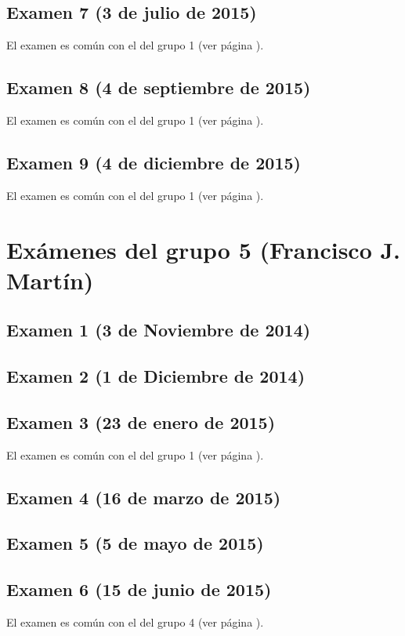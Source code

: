 \documentclass[a4paper,12pt,twoside]{book}
\begin{document}
\subsection{Examen 7 (3 de julio de 2015)}
El examen es común con el del grupo 1 (ver página \pageref{examen_14_15_5_7}).
\subsection{Examen 8 (4 de septiembre de 2015)}
El examen es común con el del grupo 1 (ver página \pageref{examen_14_15_5_7}).
\subsection{Examen 9 (4 de diciembre de 2015)}
El examen es común con el del grupo 1 (ver página \pageref{examen_14_15_5_9}).

\section{Exámenes del grupo 5 (Francisco J. Martín)}
\subsection{Examen 1 (3 de Noviembre de 2014)}
\subsection{Examen 2 (1 de Diciembre de 2014)}
\subsection{Examen 3 (23 de enero de 2015)}
El examen es común con el del grupo 1 (ver página \pageref{examen_14_15_5_3}).
\subsection{Examen 4 (16 de marzo de 2015)}
\subsection{Examen 5 (5 de mayo de 2015)}
\subsection{Examen 6 (15 de junio de 2015)}
El examen es común con el del grupo 4 (ver página \pageref{examen_14_15_4_6}).
\end{document}
